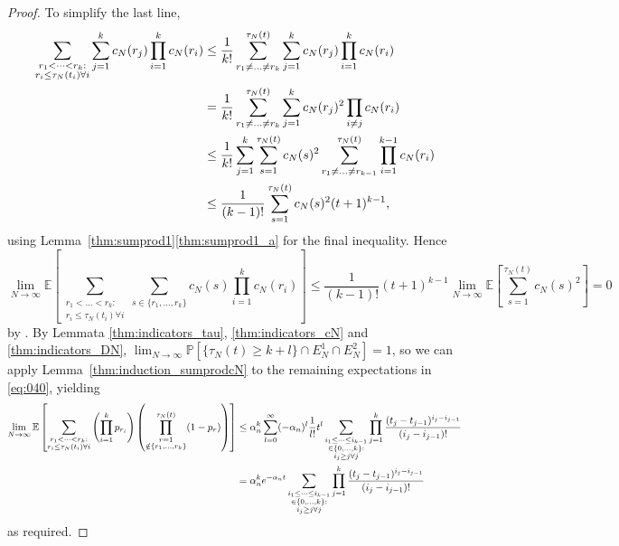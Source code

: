 \documentclass{article}
\newcommand{\Prob}{\mathbb{P}}
\newcommand{\E}{\mathbb{E}}
\newcommand{\1}[1]{\mathbbm{1}_{#1}}
\begin{document}
\begin{proof}
To simplify the last line,
\begin{align}
\sum_{\substack{r_1 <\dots< r_k :\\ r_i \leq \tau_N(t_i) \forall i}}
        \sum_{j=1}^k c_N(r_j)
        \prod_{i=1}^k c_N(r_i)
&\leq \frac{1}{k!} \sum_{r_1 \neq \dots\neq r_k}^{\tau_N(t)}
        \sum_{j=1}^k c_N(r_j)
        \prod_{i=1}^k c_N(r_i) \notag\\
&= \frac{1}{k!} \sum_{r_1 \neq \dots\neq r_k}^{\tau_N(t)}
        \sum_{j=1}^k c_N(r_j)^2
        \prod_{i\neq j} c_N(r_i) \notag\\
&\leq \frac{1}{k!} 
        \sum_{j=1}^k \sum_{s=1}^{\tau_N(t)} c_N(s)^2
        \sum_{r_1 \neq \dots\neq r_{k-1}}^{\tau_N(t)}
        \prod_{i=1}^{k-1} c_N(r_i) \notag\\
&\leq \frac{1}{(k-1)!} 
        \sum_{s=1}^{\tau_N(t)} c_N(s)^2
        (t+1)^{k-1} ,
\end{align}
using Lemma~\ref{thm:sumprod1}\ref{thm:sumprod1_a} for the final inequality.
Hence
\begin{equation}
\lim_{N\to\infty} \E \left[ \sum_{\substack{r_1 <\dots< r_k :\\ r_i \leq \tau_N(t_i) \forall i}}
        \sum_{s \in \{r_1,\dots,r_k\} } c_N(s) \prod_{i=1}^k c_N(r_i) \right]
\leq \frac{1}{(k-1)!} (t+1)^{k-1}
         \lim_{N\to\infty} \E \left[ \sum_{s=1}^{\tau_N(t)} c_N(s)^2 \right]
= 0 
\end{equation}
by \citet[Equation (3.5)]{brown2021}.
By Lemmata \ref{thm:indicators_tau}, \ref{thm:indicators_cN} and \ref{thm:indicators_DN}, $\lim_{N\to\infty} \Prob[ \{ \tau_N(t)\geq k+l \} \cap E_N^1 \cap E_N^2 ] =1$,  so we can apply Lemma~\ref{thm:induction_sumprodcN} to the remaining expectations in \eqref{eq:040}, yielding
\begin{align}
\lim_{N\to\infty} \E \left[ 
        \sum_{\substack{r_1 <\dots< r_k :\\ r_i \leq \tau_N(t_i) \forall i}}
        \left( \prod_{i=1}^k p_{r_i} \right)
        \left( \prod_{\substack{r=1 \\ \notin \{r_1,\dots,r_k\} }}^{\tau_N(t)} 
        (1-p_r) \right) \right]
&\leq \alpha_n^k
        \sum_{l=0}^{\infty} (-\alpha_n)^l \frac{1}{l!} t^l
        \sum_{\substack{i_1\leq \dots\leq i_{k-1}\\ \in \{0,\dots,k\} :
        \\ i_j \geq j \forall j}} 
        \prod_{j=1}^k \frac{(t_j - t_{j-1})^{i_j - i_{j-1}}}{(i_j - i_{j-1})! } \notag\\
&= \alpha_n^k e^{-\alpha_n t}
        \sum_{\substack{i_1\leq \dots\leq i_{k-1}\\ \in \{0,\dots,k\} :
        \\ i_j \geq j \forall j}} 
        \prod_{j=1}^k \frac{(t_j - t_{j-1})^{i_j - i_{j-1}}}{(i_j - i_{j-1})! }
\end{align}
as required.
\end{proof}
\end{document}
